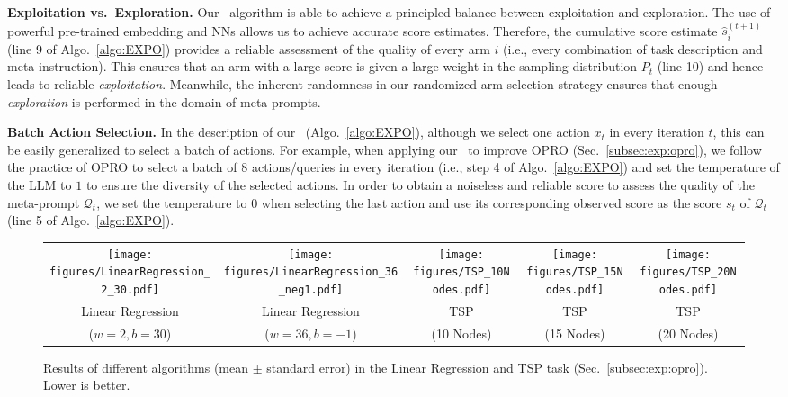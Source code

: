 \textbf{Exploitation vs.~Exploration.}
Our \alg~algorithm is able to achieve a principled balance between exploitation and exploration. 
The use of powerful pre-trained embedding and NNs 
allows us to achieve accurate score estimates. 
Therefore, the cumulative score estimate $\hat{s}_i^{(t+1)}$ (line 9 of Algo.~\ref{algo:EXPO}) provides a reliable assessment of the quality of every arm $i$ (i.e., every combination of task description and meta-instruction).
This ensures that an arm with a large score is given a large weight in the sampling distribution $P_t$ (line 10) and hence leads to reliable \emph{exploitation}.
Meanwhile, the inherent randomness in our randomized arm selection strategy ensures that enough \emph{exploration} is performed in the domain of meta-prompts.

\textbf{Batch Action Selection.}
In the description of our \alg~(Algo.~\ref{algo:EXPO}), although we select one action $x_t$ in every iteration $t$,
this can be easily generalized to select a batch of actions.
For example, when applying our \alg~to improve OPRO \cite{yang2023large} (Sec.~\ref{subsec:exp:opro}), we follow the practice of OPRO to select a batch of $8$ actions/queries in every iteration (i.e., step 4 of Algo.~\ref{algo:EXPO}) and set the temperature of the LLM to $1$ to ensure the diversity of the selected actions.
In order to obtain a noiseless and reliable score to assess the quality of the meta-prompt $\mathcal{Q}_t$, we set the temperature to $0$ when selecting the last action and use its corresponding observed score as the score $s_t$ of $\mathcal{Q}_t$ (line 5 of Algo.~\ref{algo:EXPO}).


\begin{figure*}[t]
\vspace{-3mm}
     \centering
     \begin{tabular}{ccccc}
         \hspace{-5mm}
        \texttt{[image: figures/LinearRegression\_2\_30.pdf]} & \hspace{-5mm}
        \texttt{[image: figures/LinearRegression\_36\_neg1.pdf]} & \hspace{-5mm}
        \texttt{[image: figures/TSP\_10Nodes.pdf]} &\hspace{-5mm}
        \texttt{[image: figures/TSP\_15Nodes.pdf]} &\hspace{-5mm}
        \texttt{[image: figures/TSP\_20Nodes.pdf]}\\
         Linear Regression & Linear Regression & TSP & TSP & TSP\\
         ($w=2, b=30$) & ($w=36, b=-1$) & (10 Nodes) & (15 Nodes) & (20 Nodes)\\
     \end{tabular}
 \vspace{-3mm}
    \caption{
Results of different algorithms (mean $\pm$ standard error) in the Linear Regression and TSP task (Sec.~\ref{subsec:exp:opro}). Lower is better. 
    }
\label{fig:linear_tsp_2_main_results}
\vspace{-3mm}
\end{figure*}

